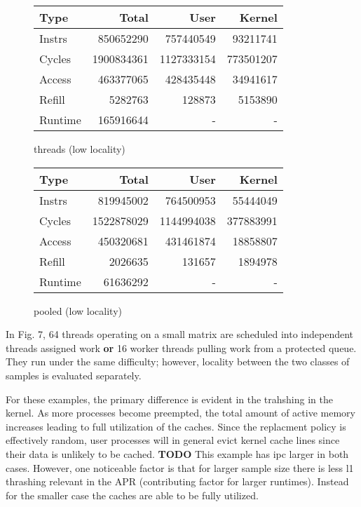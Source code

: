 \documentclass[11pt]{article}
\begin{document}
\begin{figure*}[!h]
	\begin{subtable}{.48\textwidth} 
		\centering
		\begin{tabular}{ l|rrr }
			Type    & Total      & User       & Kernel    \\
			\hline
			Instrs & 850652290 & 757440549 & 93211741 \\ 
			Cycles & 1900834361 & 1127333154 & 773501207 \\ 
			Access & 463377065 & 428435448 & 34941617 \\ 
			Refill & 5282763 & 128873 & 5153890 \\ 
			Runtime & 165916644 & - & - \\
			\hline
		\end{tabular}
		\caption{threads (low locality)}
	\end{subtable}
	\hfill
	\begin{subtable}{.48\textwidth} 
		\centering
		\begin{tabular}{ l|rrr }
			Type    & Total      & User       & Kernel    \\
			\hline
			Instrs & 819945002 & 764500953 & 55444049 \\ 
			Cycles & 1522878029 & 1144994038 & 377883991 \\ 
			Access & 450320681 & 431461874 & 18858807 \\ 
			Refill & 2026635 & 131657 & 1894978 \\ 
			Runtime & 61636292 & - & - \\
			\hline
		\end{tabular}
		\caption{pooled (low locality)}
	\end{subtable}
\end{figure*}

In Fig. 7, 64 threads operating on a small matrix are scheduled into independent threads assigned work \textbf{or} 16 worker threads pulling work from a protected queue.  They run under the same difficulty; however, locality between the two classes of samples is evaluated separately.

For these examples, the primary difference is evident in the trahshing in the kernel.  As more processes become preempted, the total amount of active memory increases leading to full utilization of the caches.  Since the replacment policy is effectively random, user processes will in general evict kernel cache lines since their data is unlikely to be cached. \textbf{TODO}
This example has ipc larger in both cases.    However, one noticeable factor is that for larger sample size there is less l1 thrashing relevant in the APR (contributing factor for larger runtimes).  Instead for the smaller case the caches are able to be fully utilized.
\end{document}
